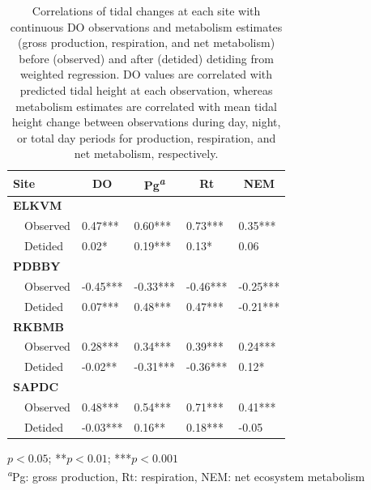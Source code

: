 \documentclass[letterpaper,12pt,oneside]{article}\usepackage[]{graphicx}\usepackage[]{color}
\begin{document}
%
\begin{table}[!tbp]
\caption{Correlations of tidal changes at each site with continuous \ac{DO} observations and metabolism estimates (gross production, respiration, and net metabolism) before (observed) and after (detided) detiding from weighted regression.  \ac{DO} values are correlated with predicted tidal height at each observation, whereas metabolism estimates are correlated with mean tidal height change between observations during day, night, or total day periods for production, respiration, and net metabolism, respectively.\label{tab:cor_res}} 
\begin{center}
\begin{tabular}{lllll}
\hline\hline
\multicolumn{1}{l}{Site}&\multicolumn{1}{c}{DO}&\multicolumn{1}{c}{Pg\textsuperscript{\textit{a}}}&\multicolumn{1}{c}{Rt}&\multicolumn{1}{c}{NEM}\tabularnewline
\hline
{\bfseries ELKVM}&&&&\tabularnewline
~~Observed& 0.47***& 0.60***& 0.73***& 0.35***\tabularnewline
~~Detided& 0.02*& 0.19***& 0.13*& 0.06 \tabularnewline
\hline
{\bfseries PDBBY}&&&&\tabularnewline
~~Observed&-0.45***&-0.33***&-0.46***&-0.25***\tabularnewline
~~Detided& 0.07***& 0.48***& 0.47***&-0.21***\tabularnewline
\hline
{\bfseries RKBMB}&&&&\tabularnewline
~~Observed& 0.28***& 0.34***& 0.39***& 0.24***\tabularnewline
~~Detided&-0.02**&-0.31***&-0.36***& 0.12*\tabularnewline
\hline
{\bfseries SAPDC}&&&&\tabularnewline
~~Observed& 0.48***& 0.54***& 0.71***& 0.41***\tabularnewline
~~Detided&-0.03***& 0.16**& 0.18***&-0.05 \tabularnewline
\hline
\end{tabular}
\end{center}
\footnotesize *$p<0.05$; **$p<0.01$; ***$p<0.001$\\\textsuperscript{\textit{a}}Pg: gross production, Rt: respiration, NEM: net ecosystem metabolism\end{table}
\end{document}
